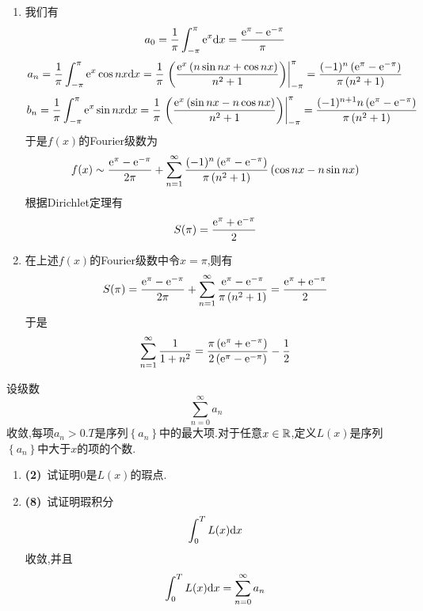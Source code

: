 \documentclass{ctexart}
\begin{document}
\begin{solution}
    \begin{enumerate}[label=\tbf{(\arabic*)},topsep=0pt,parsep=0pt,itemsep=0pt,partopsep=0pt]
        \item 我们有
            \[a_0=\dfrac{1}{\pi}\int_{-\pi}^{\pi}\mathrm{e}^{x}\mathrm{d} x=\dfrac{\mathrm{e}^{\pi}-\mathrm{e}^{-\pi}}{\pi}\]
            \[a_n=\dfrac{1}{\pi}\int_{-\pi}^{\pi}\mathrm{e}^{x}\cos nx\mathrm{d} x 
            =\dfrac{1}{\pi}\left.\left(\dfrac{\mathrm{e}^x\left(n\sin nx+\cos nx\right)}{n^2+1}\right)\right|_{-\pi}^{\pi} 
            =\dfrac{(-1)^n\left(\mathrm{e}^{\pi}-\mathrm{e}^{-\pi}\right)}{\pi\left(n^2+1\right)}\]
            \[b_n=\dfrac{1}{\pi}\int_{-\pi}^{\pi}\mathrm{e}^{x}\sin nx\mathrm{d} x 
            =\dfrac{1}{\pi}\left.\left(\dfrac{\mathrm{e}^x\left(\sin nx-n\cos nx\right)}{n^2+1}\right)\right|_{-\pi}^{\pi} 
            =\dfrac{(-1)^{n+1}n\left(\mathrm{e}^{\pi}-\mathrm{e}^{-\pi}\right)}{\pi\left(n^2+1\right)}\]
            于是$f(x)$的Fourier级数为
            \[f(x)\sim\dfrac{\mathrm{e}^{\pi}-\mathrm{e}^{-\pi}}{2\pi}+\sum_{n=1}^{\infty}\dfrac{(-1)^n\left(\mathrm{e}^{\pi}-\mathrm{e}^{-\pi}\right)}{\pi\left(n^2+1\right)}\left(\cos nx-n\sin nx\right)\]
            根据Dirichlet定理有
            \[S(\pi)=\dfrac{\mathrm{e}^{\pi}+\mathrm{e}^{-\pi}}{2}\]
        \item 在上述$f(x)$的Fourier级数中令$x=\pi$,则有
            \[S(\pi)=\dfrac{\mathrm{e}^{\pi}-\mathrm{e}^{-\pi}}{2\pi}+\sum_{n=1}^{\infty}\dfrac{\mathrm{e}^{\pi}-\mathrm{e}^{-\pi}}{\pi\left(n^2+1\right)}=\dfrac{\mathrm{e}^\pi+\mathrm{e}^{-\pi}}{2}\]
            于是
            \[\sum_{n=1}^{\infty}\dfrac{1}{1+n^2}=\dfrac{\pi\left(\mathrm{e}^{\pi}+\mathrm{e}^{-\pi}\right)}{2\left(\mathrm{e}^{\pi}-\mathrm{e}^{-\pi}\right)}-\dfrac12\]

    \end{enumerate}
\end{solution}
\begin{problem}[9.(10\songti{分})]
    设级数
    \[\sum_{n=0}^{\infty}a_n\]
    收敛,每项$a_n>0$.$T$是序列$\left\{a_n\right\}$中的最大项.对于任意$x\in\mathbb{R}$,定义$L(x)$是序列$\left\{a_n\right\}$中大于$x$的项的个数.
    \begin{enumerate}[label=\tbf{(\arabic*)},topsep=0pt,parsep=0pt,itemsep=0pt,partopsep=0pt]
        \item \textbf{(2)}\ 试证明$0$是$L(x)$的瑕点.
        \item \textbf{(8)}\ 试证明瑕积分
            \[\int_0^TL(x)\mathrm{d} x\]
            收敛,并且
            \[\int_0^TL(x)\mathrm{d} x=\sum_{n=0}^{\infty}a_n\]
    \end{enumerate}
    
\end{problem}
\end{document}
